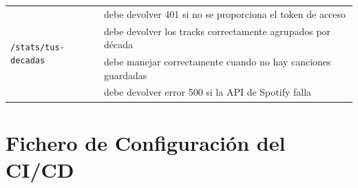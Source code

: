 \begin{longtable}{|p{5cm}|p{9cm}|}
    \multirow{4}{*}{\texttt{/stats/tus-decadas}}          & debe devolver 401 si no se proporciona el token de acceso                                \\ \cline{2-2}
                                                          & debe devolver los tracks correctamente agrupados por década                              \\ \cline{2-2}
                                                          & debe manejar correctamente cuando no hay canciones guardadas                             \\ \cline{2-2}
                                                          & debe devolver error 500 si la API de Spotify falla                                       \\ \hline
\end{longtable}

\chapter{Fichero de Configuración del CI/CD} \label{ch:anexoF}

